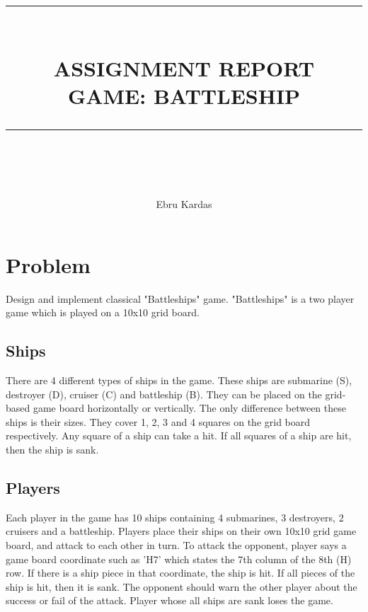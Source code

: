 \documentclass{article}
\newcommand{\HRule}[1]{\rule{\linewidth}{#1}}
\begin{document}
\title{ \normalsize \textsc{ }
		\\ [4.0cm]
		\HRule{5pt} \\
		\LARGE \textbf{\uppercase{Assignment Report \\ Game: Battleship}}
		\HRule{5pt} \\ [2.5cm]
		\normalsize \vspace*{5\baselineskip}}

\author{Ebru Kardas}

\maketitle

\newpage
\section{Problem}

	Design and implement classical "Battleships" game. "Battleships" is a two player game which 
	is played on a 10x10 grid board.
	
	\subsection{Ships}
	There are 4 different types of ships in the game. These ships are submarine (S), destroyer (D),
	cruiser (C) and battleship (B). They can be placed on the grid-based game board horizontally or
	vertically. The only difference between these ships is their sizes. They cover 1, 2, 3 and 4 squares on
	the grid board respectively. Any square of a ship can take a hit. If all squares of a ship are hit, then
	the ship is sank.

	\subsection{Players}
	Each player in the game has 10 ships containing 4 submarines, 3 destroyers, 2 cruisers and a
	battleship. Players place their ships on their own 10x10 grid game board, and attack to each other in
	turn. To attack the opponent, player says a game board coordinate such as 'H7' which states the 7th
	column of the 8th (H) row. If there is a ship piece in that coordinate, the ship is hit. If all pieces of
	the ship is hit, then it is sank. The opponent should warn the other player about the success or fail of
	the attack. Player whose all ships are sank loses the game.
	
\end{document}
